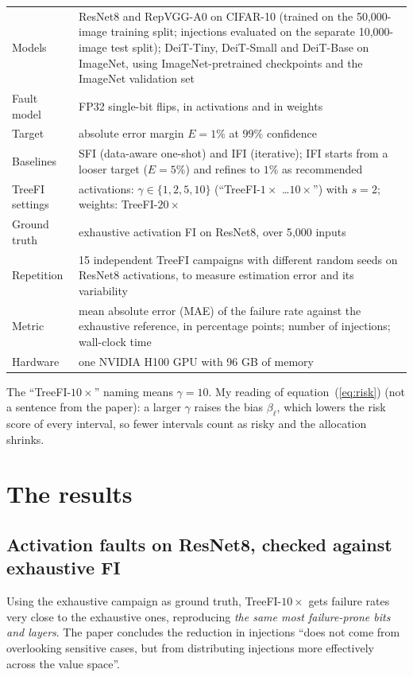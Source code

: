 \begin{center}
\small
\begin{tabular}{@{}lp{11cm}@{}}
\toprule
Models & ResNet8 and RepVGG-A0 on CIFAR-10 (trained on the 50{,}000-image training split; injections evaluated on the separate 10{,}000-image test split); DeiT-Tiny, DeiT-Small and DeiT-Base on ImageNet, using ImageNet-pretrained checkpoints and the ImageNet validation set \\
Fault model & FP32 single-bit flips, in activations and in weights \\
Target & absolute error margin $E=1\%$ at $99\%$ confidence \\
Baselines & SFI (data-aware one-shot) and IFI (iterative); IFI starts from a looser target ($E=5\%$) and refines to $1\%$ as recommended \\
TreeFI settings & activations: $\gamma\in\{1,2,5,10\}$ (``TreeFI-$1\times$ \ldots $10\times$'') with $s=2$; weights: TreeFI-$20\times$ \\
Ground truth & exhaustive activation FI on ResNet8, over 5{,}000 inputs \\
Repetition & 15 independent TreeFI campaigns with different random seeds on ResNet8 activations, to measure estimation error and its variability \\
Metric & mean absolute error (MAE) of the failure rate against the exhaustive reference, in percentage points; number of injections; wall-clock time \\
Hardware & one NVIDIA H100 GPU with 96 GB of memory \\
\bottomrule
\end{tabular}
\end{center}
The ``TreeFI-$10\times$'' naming means $\gamma=10$. My reading of equation~(\ref{eq:risk}) (not a sentence from the paper): a larger $\gamma$ raises the bias $\beta_\ell$, which lowers the risk score of every interval, so fewer intervals count as risky and the allocation shrinks.

\section{The results}

\subsection{Activation faults on ResNet8, checked against exhaustive FI}
Using the exhaustive campaign as ground truth, TreeFI-$10\times$ gets failure rates very close to the exhaustive ones, reproducing \emph{the same most failure-prone bits and layers}. The paper concludes the reduction in injections
``does not come from overlooking sensitive cases, but from distributing injections more effectively across the value space''.

